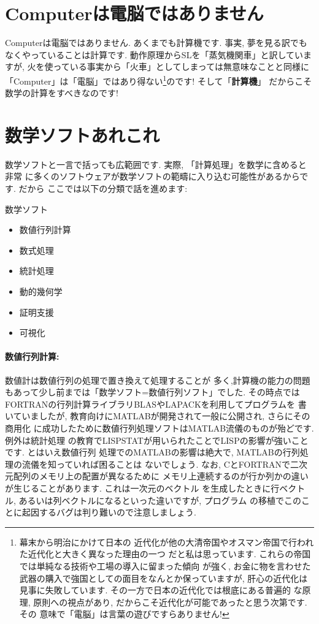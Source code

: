 \section{Computerは電脳ではありません}

Computerは電脳ではありません. あくまでも計算機です. 事実, 夢を見る訳でも
なくやっていることは計算です. 動作原理からSLを「蒸気機関車」と訳していますが,
 火を使っている事実から「火車」としてしまっては無意味なことと同様に
「Computer」は「電脳」ではあり得ない\footnote{幕末から明治にかけて日本の
近代化が他の大清帝国やオスマン帝国で行われた近代化と大きく異なった理由の一つ
だと私は思っています. これらの帝国では単純なる技術や工場の導入に留まった傾向
が強く, お金に物を言わせた武器の購入で強国としての面目をなんとか保っていますが,
 肝心の近代化は見事に失敗しています. その一方で日本の近代化では根底にある普遍的
な原理, 原則への視点があり, だからこそ近代化が可能であったと思う次第です. その
意味で「電脳」は言葉の遊びですらありません!}のです! そして「\textbf{計算機}」
だからこそ数学の計算をすべきなのです! 

\section{数学ソフトあれこれ}

数学ソフトと一言で括っても広範囲です. 実際, 「計算処理」を数学に含めると非常
に多くのソフトウェアが数学ソフトの範疇に入り込む可能性があるからです. だから
ここでは以下の分類で話を進めます:

\vspace{0.2cm}
\begin{itembox}[c]{数学ソフト}
\begin{itemize}
\item{数値行列計算}
\item{数式処理}
\item{統計処理}
\item{動的幾何学}
\item{証明支援}
\item{可視化}
\end{itemize}
\end{itembox}

\paragraph{数値行列計算:} 数値計は数値行列の処理で置き換えて処理することが
多く,計算機の能力の問題もあって少し前までは「数学ソフト=数値行列ソフト」でした.
 その時点ではFORTRANの行列計算ライブラリBLASやLAPACKを利用してプログラムを
書いていましたが, 教育向けにMATLABが開発されて一般に公開され, さらにその商用化
に成功したために数値行列処理ソフトはMATLAB流儀のものが殆どです. 例外は統計処理
の教育でLISPSTATが用いられたことでLISPの影響が強いことです. とはいえ数値行列
処理でのMATLABの影響は絶大で, MATLABの行列処理の流儀を知っていれば困ることは
ないでしょう. なお, CとFORTRANで二次元配列のメモリ上の配置が異なるために
メモリ上連続するのが行か列かの違いが生じることがあります. これは一次元のベクトル
を生成したときに行ベクトル, あるいは列ベクトルになるといった違いですが, プログラム
の移植でこのことに起因するバグは判り難いので注意しましょう.

